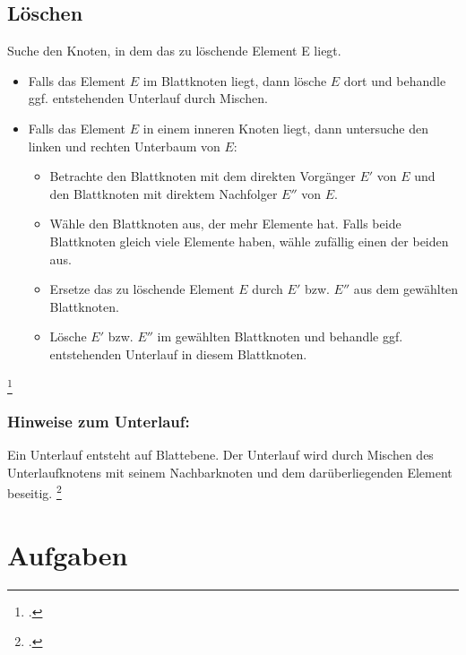 \documentclass{lehramt-informatik-haupt}
\begin{document}
\section{Löschen}

Suche den Knoten, in dem das zu löschende Element E liegt.

\begin{itemize}
\item Falls das Element $E$ im Blattknoten liegt, dann lösche $E$ dort
und behandle ggf. entstehenden Unterlauf durch Mischen.

\item Falls das Element $E$ in einem inneren Knoten liegt, dann
untersuche den linken und rechten Unterbaum von $E$:

\begin{itemize}
\item Betrachte den Blattknoten mit dem direkten Vorgänger $E'$ von $E$
und den Blattknoten mit direktem Nachfolger $E''$ von $E$.

\item Wähle den Blattknoten aus, der mehr Elemente hat. Falls beide
Blattknoten gleich viele Elemente haben, wähle zufällig einen der beiden
aus.

\item Ersetze das zu löschende Element $E$ durch $E'$ bzw. $E''$ aus dem
gewählten Blattknoten.

\item Lösche $E'$ bzw. $E''$ im gewählten Blattknoten und behandle ggf.
entstehenden Unterlauf in diesem Blattknoten.
\end{itemize}
\end{itemize}

\footcite[Seite 39 (PDF 32)]{aud:fs:5}

\subsection{Hinweise zum Unterlauf:}

Ein Unterlauf entsteht auf Blattebene. Der Unterlauf wird durch Mischen
des Unterlaufknotens mit seinem Nachbarknoten und dem darüberliegenden
Element beseitig.
\footcite[Seite 40 (PDF 33)]{aud:fs:5}


\chapter{Aufgaben}
\end{document}
